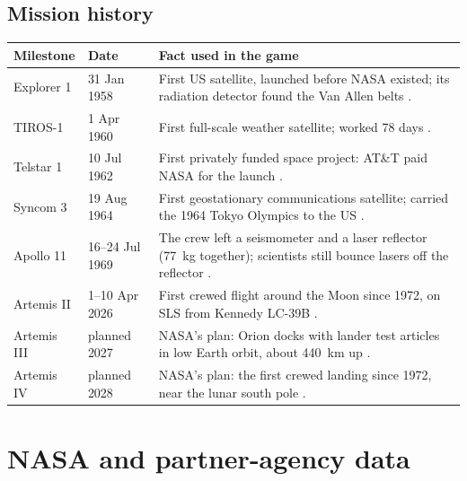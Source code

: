 \documentclass[11pt,a4paper]{article}
\begin{document}
\subsection{Mission history}
\begin{table}[H]
\centering\small
\begin{tabularx}{\textwidth}{@{}l l L@{}}
\toprule
\textbf{Milestone} & \textbf{Date} & \textbf{Fact used in the game} \\
\midrule
Explorer 1 & 31 Jan 1958 & First US satellite, launched before NASA existed; its radiation detector found the Van Allen belts \cite{explorer1}. \\
TIROS-1 & 1 Apr 1960 & First full-scale weather satellite; worked 78 days \cite{tiros}. \\
Telstar 1 & 10 Jul 1962 & First privately funded space project: AT\&T paid NASA for the launch \cite{telstar}. \\
Syncom 3 & 19 Aug 1964 & First geostationary communications satellite; carried the 1964 Tokyo Olympics to the US \cite{syncom}. \\
Apollo 11 & 16--24 Jul 1969 & The crew left a seismometer and a laser reflector (77~kg together); scientists still bounce lasers off the reflector \cite{a11, sp4205}. \\
Artemis II & 1--10 Apr 2026 & First crewed flight around the Moon since 1972, on SLS from Kennedy LC-39B \cite{a2}. \\
Artemis III & planned 2027 & NASA's plan: Orion docks with lander test articles in low Earth orbit, about 440~km up \cite{a3}. \\
Artemis IV & planned 2028 & NASA's plan: the first crewed landing since 1972, near the lunar south pole \cite{a4}. \\
\bottomrule
\end{tabularx}
\end{table}

\section{NASA and partner-agency data}
\end{document}
